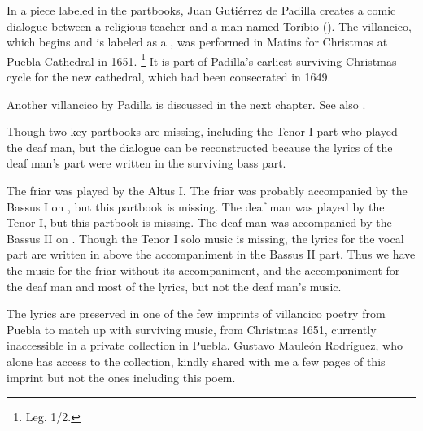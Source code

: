 In a piece labeled  in the partbooks, Juan Gutiérrez de Padilla creates a comic dialogue between a religious teacher and a  man named Toribio ().
The villancico, which begins  and is labeled as a , was performed in Matins for Christmas at Puebla Cathedral in 1651.%
\footnote{\signature{MEX-Pc}{Leg. 1/2}.}%
    \Autocites{Stanford:Catalog}{Puebla:Microfilm}
It is part of Padilla's earliest surviving Christmas cycle for the new cathedral, which had been consecrated in 1649.%
    \begin{Footnote}
        Another villancico by Padilla is discussed in the next chapter. 
        See also \autocites{Cashner:Cards}{Mauleon:PadillaPalafox}.
    \end{Footnote}
Though two key partbooks are missing, including the Tenor I part who played the deaf man, but the dialogue can be reconstructed because the lyrics of the deaf man's part were written in the surviving bass part.%
\begin{Footnote}
    The friar was played by the Altus I. 
    The friar was probably accompanied by the Bassus I on , but this partbook is missing.
    The deaf man was played by the Tenor I, but this partbook is missing.
    The deaf man was accompanied by the Bassus II on .
    Though the Tenor I solo music is missing, the lyrics for the vocal part are written in above the accompaniment in the Bassus II part. 
    Thus we have the music for the friar without its accompaniment, and the accompaniment for the deaf man and most of the lyrics, but not the deaf man's music.

    The lyrics are preserved in one of the few imprints of villancico poetry from Puebla to match up with surviving music, from Christmas 1651, currently inaccessible in a private collection in Puebla.
    Gustavo Mauleón Rodríguez, who alone has access to the collection, kindly shared with me a few pages of this imprint but not the ones including this poem. %
\end{Footnote}



